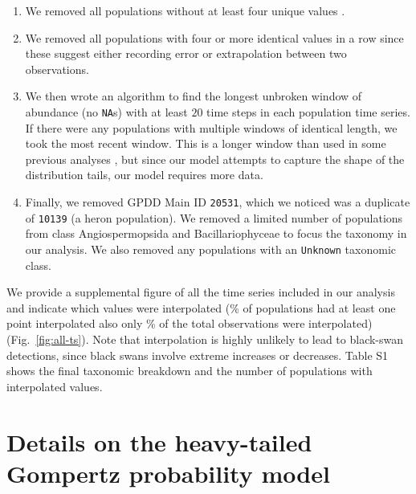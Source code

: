 \begin{enumerate}
\item We removed all populations without at least four unique values \citep[following][]{brook2006a}.

\item We removed all populations with four or more identical values in a row since these suggest either recording error or extrapolation between two observations.

\item We then wrote an algorithm to find the longest unbroken window of abundance (no \texttt{NA}s) with at least $20$ time steps in each population time series. If there were any populations with multiple windows of identical length, we took the most recent window. This is a longer window than used in some previous analyses \citep[e.g.][]{brook2006a}, but since our model attempts to capture the shape of the distribution tails, our model requires more data.

\item Finally, we removed GPDD Main ID \texttt{20531}, which we noticed was a duplicate of \texttt{10139} (a heron population). We removed a limited number of populations from class Angiospermopsida and Bacillariophyceae to focus the taxonomy in our analysis. We also removed any populations with an \texttt{Unknown} taxonomic class.

\end{enumerate}

\noindent
We provide a supplemental figure of all the time series included in our analysis and indicate which values were interpolated (\percImputedPops\% of populations had at least one point interpolated also only \percImputedPoints\% of the total observations were interpolated) (Fig.~\ref{fig:all-ts}). Note that interpolation is highly unlikely to lead to black-swan detections, since black swans involve extreme increases or decreases. Table S1 shows the final taxonomic breakdown and the number of populations with interpolated values.

\section{Details on the heavy-tailed Gompertz probability model}

